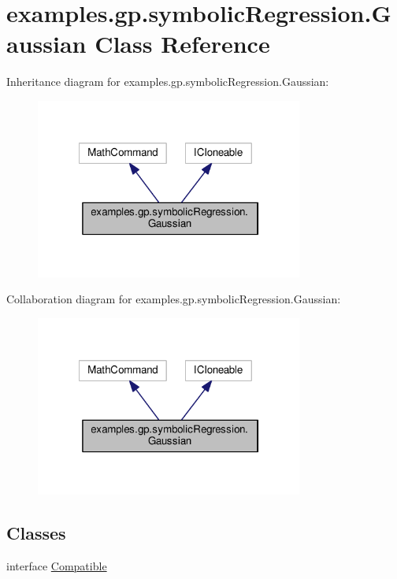 \hypertarget{classexamples_1_1gp_1_1symbolic_regression_1_1_gaussian}{\section{examples.\-gp.\-symbolic\-Regression.\-Gaussian Class Reference}
\label{classexamples_1_1gp_1_1symbolic_regression_1_1_gaussian}
}


Inheritance diagram for examples.\-gp.\-symbolic\-Regression.\-Gaussian\-:
\nopagebreak
\begin{figure}[H]
\begin{center}
\leavevmode
\includegraphics[width=249pt]{classexamples_1_1gp_1_1symbolic_regression_1_1_gaussian__inherit__graph}
\end{center}
\end{figure}


Collaboration diagram for examples.\-gp.\-symbolic\-Regression.\-Gaussian\-:
\nopagebreak
\begin{figure}[H]
\begin{center}
\leavevmode
\includegraphics[width=249pt]{classexamples_1_1gp_1_1symbolic_regression_1_1_gaussian__coll__graph}
\end{center}
\end{figure}
\subsection*{Classes}
\begin{DoxyCompactItemize}
\item 
interface \hyperlink{interfaceexamples_1_1gp_1_1symbolic_regression_1_1_gaussian_1_1_compatible}{Compatible}
\end{DoxyCompactItemize}
